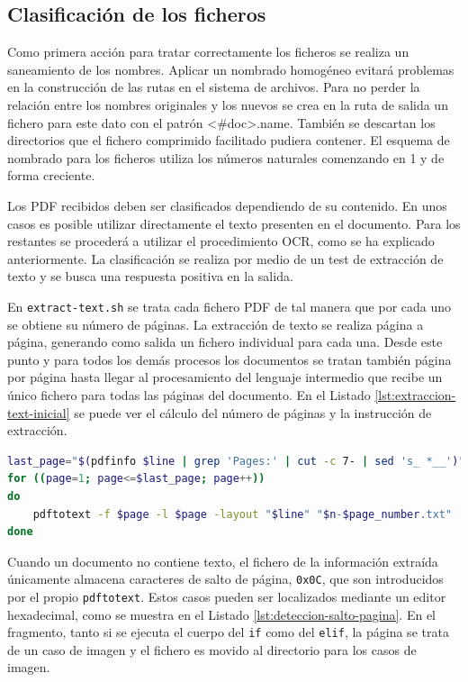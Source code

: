 
\subsection{Clasificación de los ficheros}

Como primera acción para tratar correctamente los ficheros se realiza un saneamiento de los nombres. Aplicar un nombrado homogéneo evitará problemas en la construcción de las rutas en el sistema de archivos. Para no perder la relación entre los nombres originales y los nuevos se crea en la ruta de salida un fichero para este dato con el patrón <\#doc>.name. También se descartan los directorios que el fichero comprimido facilitado pudiera contener. El esquema de nombrado para los ficheros utiliza los números naturales comenzando en 1 y de forma creciente.

Los PDF recibidos deben ser clasificados dependiendo de su contenido. En unos casos es posible utilizar directamente el texto presenten en el documento. Para los restantes se procederá a utilizar el procedimiento OCR, como se ha explicado anteriormente. La clasificación se realiza por medio de un test de extracción de texto y se busca una respuesta positiva en la salida.

En \verb|extract-text.sh| se trata cada fichero PDF de tal manera que por cada uno se obtiene su número de páginas. La extracción de texto se realiza página a página, generando como salida un fichero individual para cada una. Desde este punto y para todos los demás procesos los documentos se tratan también página por página hasta llegar al procesamiento del lenguaje intermedio que recibe un único fichero para todas las páginas del documento. En el Listado \ref{lst:extraccion-text-inicial} se puede ver el cálculo del número de páginas y la instrucción de extracción.

\begin{lstlisting}[language=bash,caption={Extracción tentativa del texto},label=lst:extraccion-text-inicial]
last_page="$(pdfinfo $line | grep 'Pages:' | cut -c 7- | sed 's_ *__')"
for ((page=1; page<=$last_page; page++))
do
    pdftotext -f $page -l $page -layout "$line" "$n-$page_number.txt"
done
\end{lstlisting}

Cuando un documento no contiene texto, el fichero de la información extraída únicamente almacena caracteres de salto de página, \verb|0x0C|, que son introducidos por el propio \verb|pdftotext|. Estos casos pueden ser localizados mediante un editor hexadecimal, como se muestra en el Listado \ref{lst:deteccion-salto-pagina}. En el fragmento, tanto si se ejecuta el cuerpo del \verb|if| como del \verb|elif|, la página se trata de un caso de imagen y el fichero es movido al directorio para los casos de imagen.

